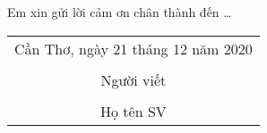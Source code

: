 \documentclass{standalone}
\begin{document}
	
	Em xin gửi lời cảm ơn chân thành đến \ldots

	\hspace*{\fill}
	\begin{tabular}{@{}c@{}} 

	\\Cần Thơ, ngày 21 tháng 12 năm 2020\\ \\
	Người viết\\ \\
	Họ tên SV
	
\end{tabular}
\end{document}
